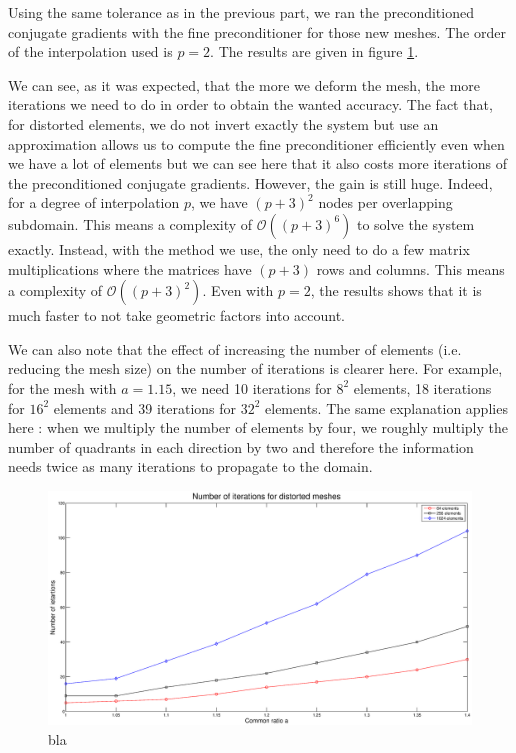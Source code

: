 Using the same tolerance as in the previous part, we ran the preconditioned conjugate gradients with the fine preconditioner for those new meshes. The order of the interpolation used is $p=2$. The results are given in figure \ref{fine_dist_iter}.

We can see, as it was expected, that the more we deform the mesh, the more iterations we need to do in order to obtain the wanted accuracy. The fact that, for distorted elements, we do not invert exactly the system but use an approximation allows us to compute the fine preconditioner efficiently even when we have a lot of elements but we can see here that it also costs more iterations of the preconditioned conjugate gradients. However, the gain is still huge. Indeed, for a degree of interpolation $p$, we have $(p+3)^2$ nodes per overlapping subdomain. This means a complexity of $\mathcal{O}((p+3)^6)$ to solve the system exactly. Instead, with the method we use, the only need to do a few matrix multiplications where the matrices have $(p+3)$ rows and columns. This means a complexity of $\mathcal{O}((p+3)^2)$. Even with $p=2$, the results shows that it is much faster to not take geometric factors into account. 

We can also note that the effect of increasing the number of elements (i.e. reducing the mesh size) on the number of iterations is clearer here. For example, for the mesh with $a = 1.15$, we need 10 iterations for $8^2$ elements, 18 iterations for $16^2$ elements and 39 iterations for $32^2$ elements. The same explanation applies here : when we multiply the number of elements by four, we roughly multiply the number of quadrants in each direction by two and therefore the information needs twice as many iterations to propagate to the domain. 

\begin{figure}
\centering
\includegraphics[scale=0.35]{Results/fine_dist_iter.eps}
\caption{bla}
\label{fine_dist_iter}
\end{figure}



